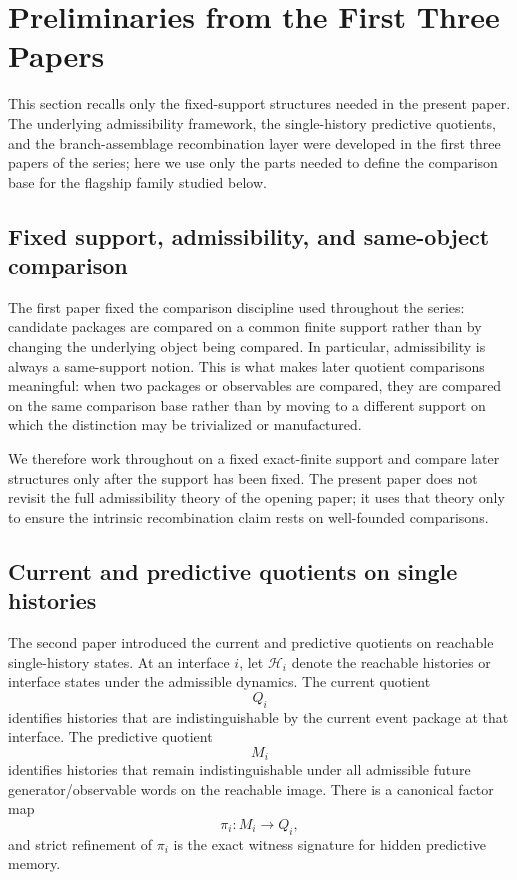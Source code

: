 \documentclass[11pt]{article}
\theoremstyle{definition}
\begin{document}
\section{Preliminaries from the First Three Papers}

This section recalls only the fixed-support structures needed in the present paper. The underlying admissibility framework, the single-history predictive quotients, and the branch-assemblage recombination layer were developed in the first three papers of the series; here we use only the parts needed to define the comparison base for the flagship family studied below. \cite{Tsiokos2026LocallyBoolean,Tsiokos2026HolonomyMemory,Tsiokos2026MarkingErasureRecombination}

\subsection{Fixed support, admissibility, and same-object comparison}

The first paper fixed the comparison discipline used throughout the series: candidate packages are compared on a common finite support rather than by changing the underlying object being compared. In particular, admissibility is always a same-support notion. This is what makes later quotient comparisons meaningful: when two packages or observables are compared, they are compared on the same comparison base rather than by moving to a different support on which the distinction may be trivialized or manufactured. \cite{Tsiokos2026LocallyBoolean}

We therefore work throughout on a fixed exact-finite support and compare later structures only after the support has been fixed. The present paper does not revisit the full admissibility theory of the opening paper; it uses that theory only to ensure the intrinsic recombination claim rests on well-founded comparisons.

\subsection{Current and predictive quotients on single histories}

The second paper introduced the current and predictive quotients on reachable single-history states. At an interface \(i\), let \(\mathcal H_i\) denote the reachable histories or interface states under the admissible dynamics. The current quotient
\[
Q_i
\]
identifies histories that are indistinguishable by the current event package at that interface. The predictive quotient
\[
M_i
\]
identifies histories that remain indistinguishable under all admissible future generator/observable words on the reachable image. There is a canonical factor map
\[
\pi_i : M_i \to Q_i,
\]
and strict refinement of \(\pi_i\) is the exact witness signature for hidden predictive memory. \cite{Tsiokos2026HolonomyMemory}
\end{document}
